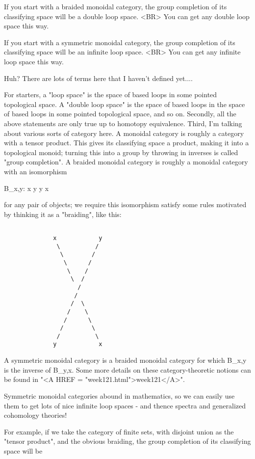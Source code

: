 If you start with a braided monoidal category, the group completion of 
its classifying space will be a double loop space.  <BR>
You can get any double loop space this way.

If you start with a symmetric monoidal category, the group completion of
its classifying space will be an infinite loop space.  <BR>
You can get any infinite loop space this way.

Huh?  There are lots of terms here that I haven't defined yet....

For starters, a "loop space" is the space of based loops in some
pointed topological space.  A "double loop space" is the space of
based loops in the space of based loops in some pointed topological
space, and so on.  Secondly, all the above statements are only true up
to homotopy equivalence.  Third, I'm talking about various sorts of
category here.  A monoidal category is roughly a category with a
tensor product.  This gives its classifying space a product, making it
into a topological monoid; turning this into a group by throwing in
inverses is called "group completion".  A braided monoidal category is
roughly a monoidal category with an isomorphism

B_{x,y}: x \otimes  y \to  y \otimes  x

for any pair of objects; we require this isomorphism satisfy some rules 
motivated by thinking it as a "braiding", like this:


\begin{verbatim}

              x            y
               \          /
                \        /
                 \      /
                  \    /
                   \  /
                     /
                    /
                   /  \
                  /    \
                 /      \
                /        \
               /          \
              y            x
\end{verbatim}
    
A symmetric monoidal category is a braided monoidal category for which
B_{x,y} is the inverse of B_{y,x}.  Some more details
on these category-theoretic notions can be found in "<A HREF =
"week121.html">week121</A>".

Symmetric monoidal categories abound in mathematics, so we can easily use 
them to get lots of nice infinite loop spaces - and thence spectra and 
generalized cohomology theories!

For example, if we take the category of finite sets, with disjoint
union as the "tensor product", and the obvious braiding, 
the group completion of its classifying space will be


